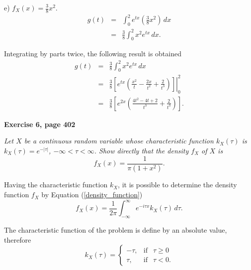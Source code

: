 \documentclass[12pt]{article}
\begin{document}
	\noindent e) $f_X (x) = \frac{3}{8}x^2$.  
	\begin{eqnarray*}
		g(t) &=& \int_{0}^{2} e^{tx} \left(\frac{3}{8}x^2 \right)\, dx \\
		&=& \frac{3}{8} \int_{0}^{2} x^2e^{tx} \, dx.
	\end{eqnarray*}

	Integrating by parts twice, the following result is obtained
	\begin{eqnarray*}
		g(t) &=& \frac{3}{8} \int_{0}^{2} x^2e^{tx} \, dx\\
		&=& \frac{3}{8} \left. \left[e^{tx} \left( \frac{x^2}{t} - \frac{2x}{t^2} + \frac{2}{t^3}\right)\right] \right|_0^2 \\
		&=& \frac{3}{8} \left[e^{2x} \left( \frac{4t^2-4t+2}{t^3} + \frac{2}{t^3}\right)\right].
	\end{eqnarray*}

	{\bf Exercise 6, page 402}
	
	{\em Let $X$ be a continuous random variable whose characteristic function $k_X (\tau)$ is $k_X(\tau) = e^{-|\tau|}$, $-\infty < \tau < \infty$. Show directly that the density $f_X$ of $X$ is
	\begin{equation*}
		f_X(x) = \frac{1}{\pi (1+x^2)}.
	\end{equation*}
	}

	Having the characteristic function $k_X$, it is possible to determine the density function $f_X$ by Equation (\ref{density_function})
	\begin{equation}
	f_X(x) = \frac{1}{2\pi} \int_{-\infty}^{\infty} e^{-i \tau x} k_X(\tau) \, d\tau.
	\label{density_function}
	\end{equation}
	
	The characteristic function of the problem is define by an absolute value, therefore
	\begin{equation}
	k_X(\tau)= \left\{ \begin{array}{lcc}
	-\tau, &   \text{if}  & \tau \geq 0 \\
	\tau, &  \text{if}  & \tau < 0.
	\end{array}
	\right.
	\label{char_func}
	\end{equation}
	
\end{document}
